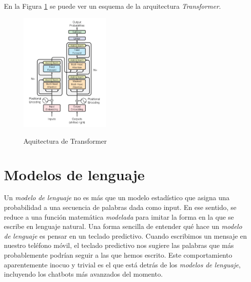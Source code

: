 En la Figura \ref{fig:transformer_architecture} se puede ver un esquema de la arquitectura \textit{Transformer}.

\begin{figure}[]
    \caption[Aquitectura de Transformer]{Aquitectura de Transformer}
    \centering
    \includegraphics[width=0.4\textwidth]{./figuras/Transformer_architecture.png}
    \label{fig:transformer_architecture}
\end{figure}

\section{Modelos de lenguaje}


Un \textit{modelo de lenguaje} no es más que un modelo estadístico que asigna una probabilidad a una secuencia de palabras dada como input. En ese sentido, se reduce a una función matemática \textit{modelada} para imitar la forma en la que se escribe en lenguaje natural. Una forma sencilla de entender qué hace un \textit{modelo de lenguaje} es pensar en un teclado predictivo. Cuando escribimos un mensaje en nuestro teléfono móvil, el teclado predictivo nos sugiere las palabras que más probablemente podrían seguir a las que hemos escrito. Este comportamiento aparentemente inocuo y trivial es el que está detrás de los \textit{modelos de lenguaje}, incluyendo los chatbots más avanzados del momento.

